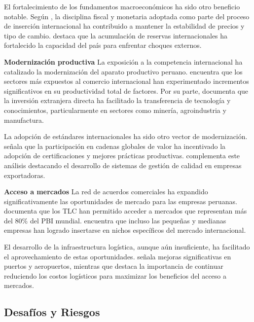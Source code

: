 \documentclass[12pt, a4paper]{article}
\begin{document}
El fortalecimiento de los fundamentos macroeconómicos ha sido otro beneficio notable. Según \textcite{velarde2019politica}, la disciplina fiscal y monetaria adoptada como parte del proceso de inserción internacional ha contribuido a mantener la estabilidad de precios y tipo de cambio. \textcite{pastor2021reservas} destaca que la acumulación de reservas internacionales ha fortalecido la capacidad del país para enfrentar choques externos.

\textbf{Modernización productiva}
La exposición a la competencia internacional ha catalizado la modernización del aparato productivo peruano. \textcite{tello2019productividad} encuentra que los sectores más expuestos al comercio internacional han experimentado incrementos significativos en su productividad total de factores. Por su parte, \textcite{garcia2020innovacion} documenta que la inversión extranjera directa ha facilitado la transferencia de tecnología y conocimientos, particularmente en sectores como minería, agroindustria y manufactura.

La adopción de estándares internacionales ha sido otro vector de modernización. \textcite{kuramoto2018cadenas} señala que la participación en cadenas globales de valor ha incentivado la adopción de certificaciones y mejores prácticas productivas. \textcite{távara2021calidad} complementa este análisis destacando el desarrollo de sistemas de gestión de calidad en empresas exportadoras.

\textbf{Acceso a mercados}
La red de acuerdos comerciales ha expandido significativamente las oportunidades de mercado para las empresas peruanas. \textcite{ferrero2019tlc} documenta que los TLC han permitido acceder a mercados que representan más del 80\% del PBI mundial. \textcite{malca2020pymes} encuentra que incluso las pequeñas y medianas empresas han logrado insertarse en nichos específicos del mercado internacional.

El desarrollo de la infraestructura logística, aunque aún insuficiente, ha facilitado el aprovechamiento de estas oportunidades. \textcite{bonifaz2021infraestructura} señala mejoras significativas en puertos y aeropuertos, mientras que \textcite{rosales2019conectividad} destaca la importancia de continuar reduciendo los costos logísticos para maximizar los beneficios del acceso a mercados.

\subsection{Desafíos y Riesgos}
\end{document}
